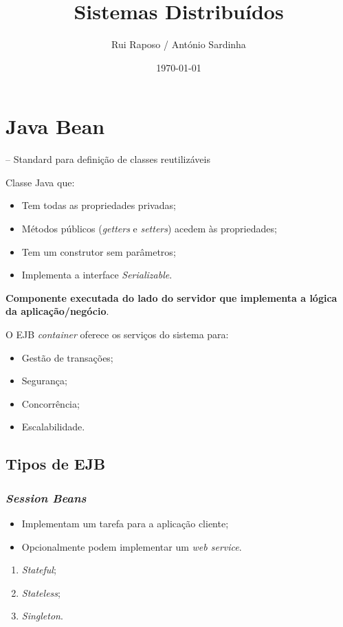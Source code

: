 \documentclass{article}
\date{\today \\ \currenttime}
\title{Sistemas Distribuídos}
\author{Rui Raposo / António Sardinha}
\begin{document}
\maketitle

\section{Java Bean} -- Standard para definição de classes reutilizáveis

Classe Java que:
\begin{itemize}
	\item Tem todas as propriedades privadas;
	\item Métodos públicos (\textit{getters} e \textit{setters}) acedem às propriedades;
	\item Tem um construtor sem parâmetros;
	\item Implementa a interface \textit{Serializable}.
\end{itemize}

\textbf{Componente executada do lado do servidor que implementa a lógica da aplicação/negócio}.

O EJB \textit{container} oferece os serviços do sistema para:
\begin{itemize}
	\item Gestão de transações;
	\item Segurança;
	\item Concorrência;
	\item Escalabilidade.
\end{itemize}

\subsection{Tipos de EJB}

\subsubsection{\textit{Session Beans}}

\begin{itemize}
	\item Implementam um tarefa para a aplicação cliente;
	\item Opcionalmente podem implementar um \textit{web service}.
\end{itemize}

\begin{enumerate}
	\item \textit{Stateful};
	\item \textit{Stateless};
	\item \textit{Singleton}.
\end{enumerate}
\end{document}
